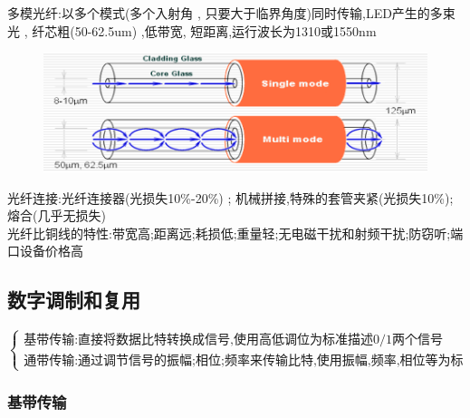 \documentclass[UTF8,a4paper]{ctexart}
\newcommand{\spaceline}{\vspace{\baselineskip}}
\begin{document}
\begin{itemize}
    多模光纤:以多个模式(多个入射角 , 只要大于临界角度)同时传输,LED产生的多束光 , 纤芯粗(50-62.5um) ,低带宽, 短距离,运行波长为1310或1550nm
    \begin{figure}[H]
      \centering
      \includegraphics[scale = 0.3]{assets/jisuanjiwangluo_4ce0a.png}
    \end{figure}
    光纤连接:光纤连接器(光损失10\%-20\%) ; 机械拼接,特殊的套管夹紧(光损失10\%);熔合(几乎无损失)\\
    光纤比铜线的特性:带宽高;距离远;耗损低;重量轻;无电磁干扰和射频干扰;防窃听;端口设备价格高
  \end{itemize}

  \subsection{数字调制和复用}

  \spaceline
  $\left \{ \begin{array}{l}
  \text{基带传输:直接将数据比特转换成信号,使用高低调位为标准描述0/1两个信号}\\
  \text{通带传输:通过调节信号的振幅;相位;频率来传输比特,使用振幅,频率,相位等为标准描述}
  \end{array} \right .$

  \subsubsection{基带传输}
\end{document}
